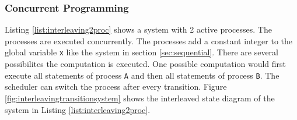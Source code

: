 \documentclass[a4paper, twoside]{article}
\begin{document}
\subsubsection{Concurrent Programming}
\label{sec:concurrent}

Listing \ref{list:interleaving2proc} shows a system with 2 active processes. The processes are executed concurrently. The processes add a constant integer to the global variable \verb|x| like the system in section \ref{sec:sequential}. There are several possibilites the computation is executed. One possible computation would first execute all statements of process \verb|A| and then all statements of process \verb|B|. The scheduler can switch the process after every transition. Figure \ref{fig:interleavingtransitionsystem} shows the interleaved state diagram of the system in Listing \ref{list:interleaving2proc}.

  
\end{document}
